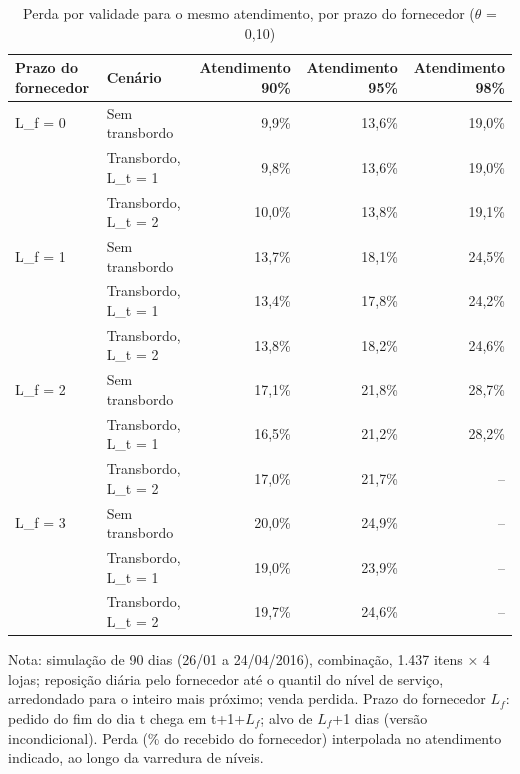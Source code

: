 \begin{table}[htbp]
\centering
\small
\caption{Perda por validade para o mesmo atendimento, por prazo do fornecedor ($\theta$ = 0,10)}
\label{tab:tbr_fronteira}
\begin{tabular}{llrrr}
\toprule
Prazo do fornecedor & Cenário & Atendimento 90\% & Atendimento 95\% & Atendimento 98\% \\
\midrule
L\_f = 0 & Sem transbordo & 9,9\% & 13,6\% & 19,0\% \\
 & Transbordo, L\_t = 1 & 9,8\% & 13,6\% & 19,0\% \\
 & Transbordo, L\_t = 2 & 10,0\% & 13,8\% & 19,1\% \\
\addlinespace
L\_f = 1 & Sem transbordo & 13,7\% & 18,1\% & 24,5\% \\
 & Transbordo, L\_t = 1 & 13,4\% & 17,8\% & 24,2\% \\
 & Transbordo, L\_t = 2 & 13,8\% & 18,2\% & 24,6\% \\
\addlinespace
L\_f = 2 & Sem transbordo & 17,1\% & 21,8\% & 28,7\% \\
 & Transbordo, L\_t = 1 & 16,5\% & 21,2\% & 28,2\% \\
 & Transbordo, L\_t = 2 & 17,0\% & 21,7\% & -- \\
\addlinespace
L\_f = 3 & Sem transbordo & 20,0\% & 24,9\% & -- \\
 & Transbordo, L\_t = 1 & 19,0\% & 23,9\% & -- \\
 & Transbordo, L\_t = 2 & 19,7\% & 24,6\% & -- \\
\bottomrule
\end{tabular}
\par\smallskip
{\footnotesize Nota: simulação de 90 dias (26/01 a 24/04/2016), combinação, 1.437 itens × 4 lojas; reposição diária pelo fornecedor até o quantil do nível de serviço, arredondado para o inteiro mais próximo; venda perdida. Prazo do fornecedor $L_f$: pedido do fim do dia t chega em t+1+$L_f$; alvo de $L_f$+1 dias (versão incondicional). Perda (\% do recebido do fornecedor) interpolada no atendimento indicado, ao longo da varredura de níveis.}
\end{table}
